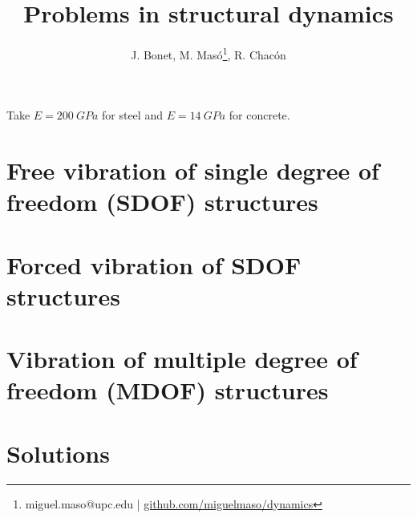 \documentclass{problems}
\title[Structural dynamics]{Problems in structural dynamics}
\author{J. Bonet, M. Masó\footnote{miguel.maso@upc.edu | \href{https://github.com/miguelmaso/dynamics}{github.com/miguelmaso/dynamics}}, R. Chacón}
\begin{document}
\maketitle

Take $E=\SI{200}{GPa}$ for steel and $E=\SI{14}{GPa}$ for concrete.

\section{Free vibration of single degree of freedom (SDOF) structures}





\section{Forced vibration of SDOF structures}











\section{Vibration of multiple degree of freedom (MDOF) structures}






\newpage
\section{Solutions}
\shipoutAnswer

{}
\printbibliography
\end{document}
